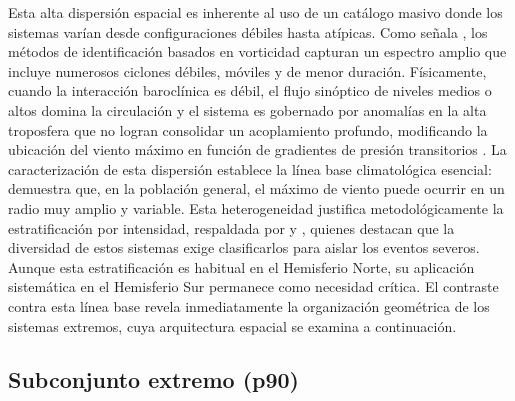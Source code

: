 Esta alta dispersión espacial es inherente al uso de un catálogo masivo donde los sistemas varían desde configuraciones débiles hasta atípicas. Como señala \citet{sinclair1994objective}, los métodos de identificación basados en vorticidad capturan un espectro amplio que incluye numerosos ciclones débiles, móviles y de menor duración. Físicamente, cuando la interacción baroclínica es débil, el flujo sinóptico de niveles medios o altos domina la circulación y el sistema es gobernado por anomalías en la alta troposfera que no logran consolidar un acoplamiento profundo, modificando la ubicación del viento máximo en función de gradientes de presión transitorios \citep{hoskins2005new}.
La caracterización de esta dispersión establece la línea base climatológica esencial: demuestra que, en la población general, el máximo de viento puede ocurrir en un radio muy amplio y variable. Esta heterogeneidad justifica metodológicamente la estratificación por intensidad, respaldada por \citet{corner2025classification} y \citet{eisenstein2023identification}, quienes destacan que la diversidad de estos sistemas exige clasificarlos para aislar los eventos severos. Aunque esta estratificación es habitual en el Hemisferio Norte, su aplicación sistemática en el Hemisferio Sur permanece como necesidad crítica. El contraste contra esta línea 
base revela inmediatamente la organización geométrica de los sistemas extremos, cuya arquitectura espacial se examina a continuación.

\subsection{Subconjunto extremo (p90)}\label{sec:kde_espacial_p90}


